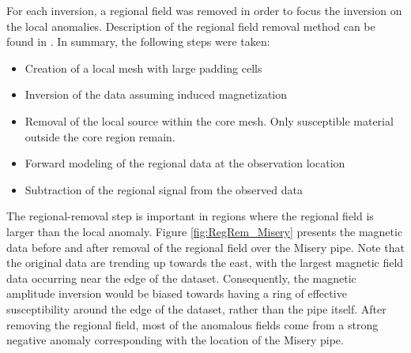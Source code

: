 For each inversion, a regional field was removed in order to focus the inversion on the local anomalies.
Description of the regional field removal method can be found in \cite{LiRegRem1998}.
In summary, the following steps were taken:
\begin{itemize}
\item Creation of a local mesh with large padding cells
\item Inversion of the data assuming induced magnetization
\item Removal of the local source within the core mesh. Only susceptible material outside the core region remain.
\item Forward modeling of the regional data at the observation location
\item Subtraction of the regional signal from the observed data
\end{itemize}
The regional-removal step is important in regions where the regional field is larger than the local anomaly.
Figure \ref{fig:RegRem_Misery} presents the magnetic data before and after removal of the regional field over the Misery pipe.
Note that the original data are trending up towards the east, with the largest magnetic field data occurring near the edge of the dataset. Consequently, the magnetic amplitude inversion would be biased towards having a ring of effective susceptibility around the edge of the dataset, rather than the pipe itself. 
After removing the regional field, most of the anomalous fields come from a strong negative anomaly corresponding with the location of the Misery pipe.

